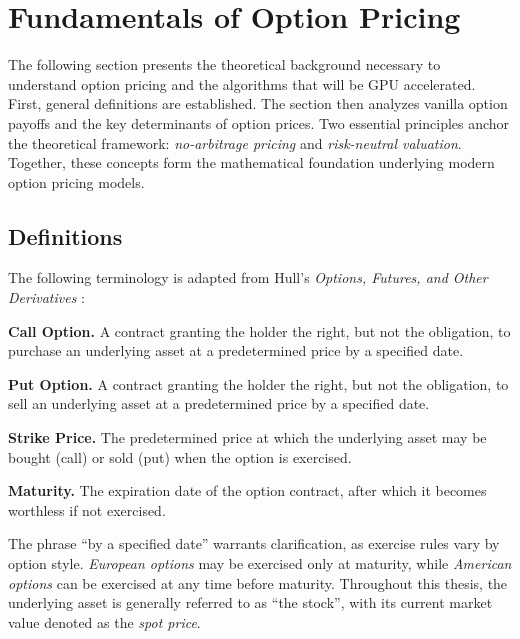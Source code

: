 \documentclass[english,12pt,a4paper,pdftex,sci,utf8]{aaltothesis}
\begin{document}
\section{Fundamentals of Option Pricing} \label{sec:theory}

The following section presents the theoretical background necessary to understand option pricing and the algorithms that will be GPU accelerated. First, general definitions are established. The section then analyzes vanilla option payoffs and the key determinants of option prices. Two essential principles anchor the theoretical framework: \emph{no-arbitrage pricing} and \emph{risk-neutral valuation}. Together, these concepts form the mathematical foundation underlying modern option pricing models.

\subsection{Definitions}\label{subsec:definitions}
The following terminology is adapted from Hull's \emph{Options, Futures, and Other Derivatives} \cite{hull2018}:

\vspace{0.5\baselineskip}
\noindent\textbf{Call Option.} A contract granting the holder the right, but not the obligation, to purchase an underlying asset at a predetermined price by a specified date.

\vspace{0.5\baselineskip}
\noindent\textbf{Put Option.} A contract granting the holder the right, but not the obligation, to sell an underlying asset at a predetermined price by a specified date.

\vspace{0.5\baselineskip}
\noindent\textbf{Strike Price.} The predetermined price at which the underlying asset may be bought (call) or sold (put) when the option is exercised.

\vspace{0.5\baselineskip}
\noindent\textbf{Maturity.} The expiration date of the option contract, after which it becomes worthless if not exercised.

\vspace{\baselineskip}
\noindent The phrase ``by a specified date'' warrants clarification, as exercise rules vary by option style. \emph{European options} may be exercised only at maturity, while \emph{American options} can be exercised at any time before maturity. Throughout this thesis, the underlying asset is generally referred to as ``the stock'', with its current market value denoted as the \emph{spot price}.
\end{document}
